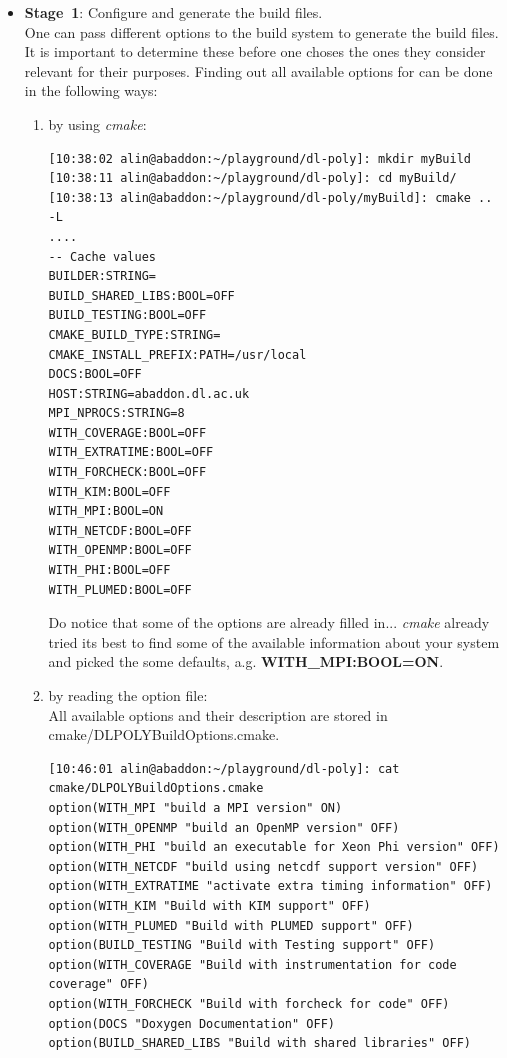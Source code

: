 \begin{itemize}
\item {\bf Stage~1}: Configure and generate the build files. \\

One can pass different options to the build system to generate
the build files.  It is important to determine these before one
choses the ones they consider relevant for their purposes.
Finding out all available options for \D can be done in the
following ways:

\begin{enumerate}[label=\textbf{\alph*)}]%
\item by using {\sl cmake}:
\begin{lstlisting}
[10:38:02 alin@abaddon:~/playground/dl-poly]: mkdir myBuild
[10:38:11 alin@abaddon:~/playground/dl-poly]: cd myBuild/
[10:38:13 alin@abaddon:~/playground/dl-poly/myBuild]: cmake .. -L
....
-- Cache values
BUILDER:STRING=
BUILD_SHARED_LIBS:BOOL=OFF
BUILD_TESTING:BOOL=OFF
CMAKE_BUILD_TYPE:STRING=
CMAKE_INSTALL_PREFIX:PATH=/usr/local
DOCS:BOOL=OFF
HOST:STRING=abaddon.dl.ac.uk
MPI_NPROCS:STRING=8
WITH_COVERAGE:BOOL=OFF
WITH_EXTRATIME:BOOL=OFF
WITH_FORCHECK:BOOL=OFF
WITH_KIM:BOOL=OFF
WITH_MPI:BOOL=ON
WITH_NETCDF:BOOL=OFF
WITH_OPENMP:BOOL=OFF
WITH_PHI:BOOL=OFF
WITH_PLUMED:BOOL=OFF
\end{lstlisting}

Do notice that some of the options are already filled in...
{\em cmake} already tried its best to find some of the
available information about your system and picked the some
defaults, a.g. {\bf WITH\_MPI:BOOL=ON}.

\item by reading the \D option file: \\
All available options and their description are stored in
{\sc cmake/DLPOLYBuildOptions.cmake}.
\begin{lstlisting}
[10:46:01 alin@abaddon:~/playground/dl-poly]: cat cmake/DLPOLYBuildOptions.cmake
option(WITH_MPI "build a MPI version" ON)
option(WITH_OPENMP "build an OpenMP version" OFF)
option(WITH_PHI "build an executable for Xeon Phi version" OFF)
option(WITH_NETCDF "build using netcdf support version" OFF)
option(WITH_EXTRATIME "activate extra timing information" OFF)
option(WITH_KIM "Build with KIM support" OFF)
option(WITH_PLUMED "Build with PLUMED support" OFF)
option(BUILD_TESTING "Build with Testing support" OFF)
option(WITH_COVERAGE "Build with instrumentation for code coverage" OFF)
option(WITH_FORCHECK "Build with forcheck for code" OFF)
option(DOCS "Doxygen Documentation" OFF)
option(BUILD_SHARED_LIBS "Build with shared libraries" OFF)


\end{lstlisting}
\end{enumerate}
\end{itemize}

